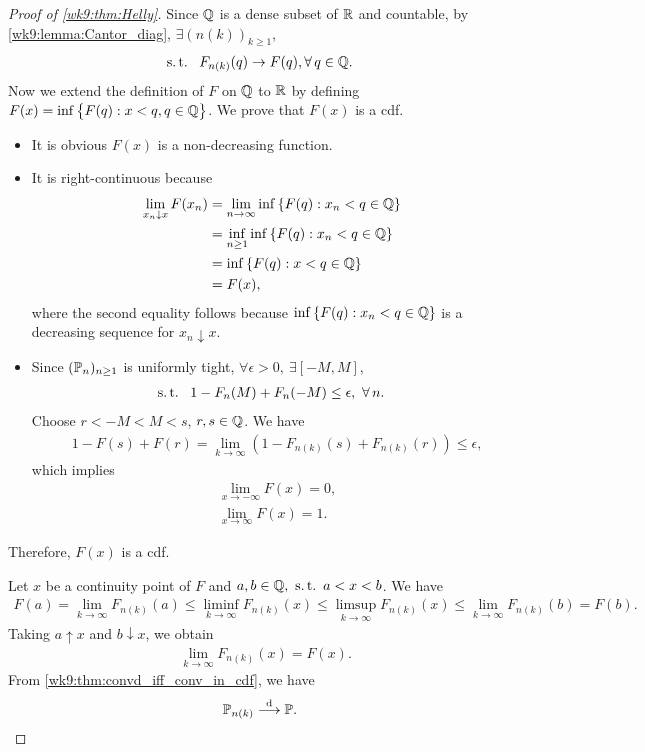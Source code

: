 \documentclass[12pt]{article}
\begin{document}
\begin{proof}[Proof of \cref{wk9:thm:Helly}]
Since $\mathbb{Q}$ is a dense subset of $\mathbb{R}$ and countable, by \cref{wk9:lemma:Cantor_diag}, $\exists \left(n(k)\right)_{k \geq 1}$,
\begin{align*}
\st\ F_{n(k)}(q) \to F(q), \forall q \in \bbQ.
\end{align*}
Now we extend the definition of $F$ on $\mathbb{Q}$ to $\mathbb{R}$ by defining $F(x) = \inf \big\{F(q): x < q, q \in \mathbb{Q}\big\}$. We prove that $F(x)$ is a cdf.
\begin{itemize}
	\item It is obvious $F(x)$ is a non-decreasing function. 
	\item It is right-continuous because
\begin{align*}
\lim_{x_n \downarrow x} F(x_n) 
&= \lim_{n \to \infty} \inf\left\{F(q) : x_n < q \in \mathbb{Q}\right\} \\
&= \inf_{n \geq 1} \inf\left\{F(q) : x_n < q \in \mathbb{Q}\right\} \\
&= \inf \left\{F(q) : x < q \in \mathbb{Q}\right\} \\
&= F(x),
\end{align*}
where the second equality follows because $\inf\left\{F(q) : x_n < q \in \mathbb{Q}\right\}$ is a decreasing sequence for $x_n\downarrow x$. 
\item Since $(\P_n)_{n \geq 1}$ is uniformly tight, $\forall \epsilon > 0, \ \exists [-M, M]$,
\begin{align*}
\st\ 1 - F_n(M) + F_n(-M) \leq \epsilon, \ \forall n.
\end{align*}
Choose $r < -M < M < s$, $r, s \in \mathbb{Q}$. We have
\begin{align*}
&1 - F(s) + F(r) 
= \lim_{k \to \infty} \left(1 - F_{n(k)}(s) + F_{n(k)}(r)\right)
\leq \epsilon,
\end{align*}
which implies
\begin{align*}
&\lim_{x \to -\infty}F(x) = 0, \\
&\lim_{x \to \infty}F(x) = 1.
\end{align*}
\end{itemize}
Therefore, $F(x)$ is a cdf.

Let $x$ be a continuity point of $F$ and $a, b \in \bbQ, \ \st a < x < b$. We have
\begin{align*}
F(a) 
= \lim_{k \to \infty} F_{n(k)}(a) 
\leq \liminf_{k \to \infty} F_{n(k)}(x)
\leq \limsup_{k \to \infty} F_{n(k)}(x)
\leq \lim_{k \to \infty} F_{n(k)}(b)
= F(b).
\end{align*}
Taking $a\uparrow x$ and $b\downarrow x$, we obtain
\begin{align*}
&\lim_{k \to \infty} F_{n(k)}(x) = F(x).
\end{align*}
From \cref{wk9:thm:convd_iff_conv_in_cdf}, we have
\begin{align*}
\P_{n(k)} \convd \P.
\end{align*}
\end{proof}
\end{document}
